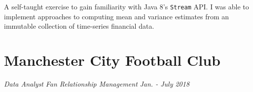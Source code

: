 \documentclass[letterpaper,11pt]{article}
\newcommand{\resumeItem}[3]{
	\item\small{
		\textbf{#1}\hfill\tiny{#2\\}\small{ #3 \vspace{-2pt}}
	}
}
\newcommand{\resumeSubItem}[3]{\resumeItem{#1}{#2}{#3}\vspace{-2pt}}
\begin{document}
\begin{description}[style=multiline,leftmargin=3cm]
	\item[Summarizing financial data \textnormal{\tiny
		      \href{https://adrian.ng/java/yahoofinance/\#stream}{adrian.ng/java/yahoofinance/\#stream}}]
	      A self-taught exercise to gain familiarity with Java 8's \texttt{Stream} API. I was able to implement approaches to computing mean and variance estimates from an immutable collection of time-series financial data.
\end{description}




\newpage
\section{Manchester City Football Club}
\textit{Data Analyst}
\hfill
\textit{Fan Relationship Management}
\hfill
\textit{Jan. - July 2018}
\end{document}
